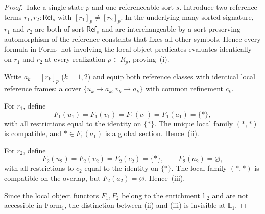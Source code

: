 \begin{proof}
Take a single state $p$ and one referenceable sort $s$. Introduce two reference terms $r_1,r_2:\mathsf{Ref}_s$ with $[r_1]_p\neq [r_2]_p$. In the underlying many-sorted signature, $r_1$ and $r_2$ are both of sort $\mathsf{Ref}_s$ and are interchangeable by a sort-preserving automorphism of the reference constants that fixes all other symbols. Hence every formula in $\mathrm{Form}_1$ not involving the local-object predicates evaluates identically on $r_1$ and $r_2$ at every realization $\rho\in R_p$, proving~\textup{(i)}.

Write $a_k=[r_k]_p$ ($k=1,2$) and equip both reference classes with identical local reference frames: a cover $\{u_k\to a_k,v_k\to a_k\}$ with common refinement $c_k$.

For $r_1$, define
\[
F_1(u_1)=F_1(v_1)=F_1(c_1)=F_1(a_1)=\{*\},
\]
with all restrictions equal to the identity on $\{*\}$. The unique local family $(*,*)$ is compatible, and $*\in F_1(a_1)$ is a global section. Hence~\textup{(ii)}.

For $r_2$, define
\[
F_2(u_2)=F_2(v_2)=F_2(c_2)=\{*\},\qquad F_2(a_2)=\varnothing,
\]
with all restrictions to $c_2$ equal to the identity on $\{*\}$. The local family $(*,*)$ is compatible on the overlap, but $F_2(a_2)=\varnothing$. Hence~\textup{(iii)}.

Since the local object functors $F_1,F_2$ belong to the enrichment $\mathbb{L}_2$ and are not accessible in $\mathrm{Form}_1$, the distinction between \textup{(ii)} and \textup{(iii)} is invisible at $\mathbb{L}_1$.
\end{proof}

